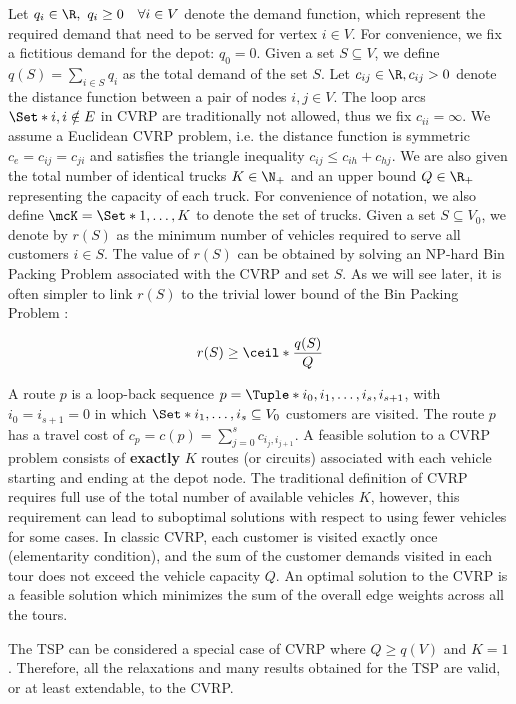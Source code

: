 Let $q_{i} \in \R,\ q_{i} \ge 0 \quad \forall i \in V$ denote the demand function, which represent the required demand that need to be served for vertex $i \in V$.
For convenience, we fix a fictitious demand for the depot: $q_0 = 0$.
Given a set $S \subseteq V$, we define $q(S) = \sum_{i \in S} q_i$ as the total demand of the set $S$.
Let $c_{ij} \in \R, c_{ij} > 0$ denote the distance function between a pair of nodes  $i, j \in V$.
The loop arcs $\Set*{i, i} \notin E$ in CVRP are traditionally not allowed, thus we fix $c_{ii} = \infty$.
We assume a Euclidean CVRP problem, i.e. the distance function is symmetric $c_e = c_{ij} = c_{ji}$ and satisfies the triangle inequality $c_{ij} \le c_{ih} + c_{hj}$.
We are also given the total number of identical trucks $K \in \N_+$ and an upper bound $Q \in \R_+$ representing the capacity of each truck.
For convenience of notation, we also define $\mcK = \Set*{1, \dots, K}$ to denote the set of trucks.
Given a set $S \subseteq V_0$, we denote by $r(S)$ as the minimum number of vehicles required to serve all customers $i \in S$.
The value of $r(S)$ can be obtained by solving an NP-hard Bin Packing Problem associated with the CVRP and set $S$.
As we will see later, it is often simpler to link $r(S)$ to the trivial lower bound of the Bin Packing Problem \parencite{martello1990}:

\begin{equation}
	r(S) \ge \ceil*{\frac{q(S)}{Q}}
\end{equation}

A route $p$ is a loop-back sequence $p = \Tuple*{i_0, i_1, \dots, i_s, i_{s + 1}}$, with $i_0 = i_{s + 1} = 0$ in which
$\Set*{i_1, \dots, i_s} \subseteq V_0$ customers are visited.
The route $p$ has a travel cost of $c_p = c(p) = \sum_{j=0}^s c_{i_j,i_{j+1}}$.
A feasible solution to a CVRP problem consists of \textbf{exactly} $K$ routes (or circuits)
associated with each vehicle starting and ending at the depot node.
The traditional definition of CVRP requires full use of the total number of available vehicles $K$,
however,
this requirement can lead to suboptimal solutions with respect to using fewer vehicles for some cases.
In classic CVRP, each customer is visited exactly once (elementarity condition),
and the sum of the customer demands visited in each tour does not exceed the vehicle capacity $Q$.
An optimal solution to the CVRP is a feasible solution which minimizes the sum of the overall edge weights across all the tours.

\medskip

The TSP can be considered a special case of CVRP where $Q \ge q(V)$ and $K = 1$.
Therefore, all the relaxations and many results obtained for the TSP are valid, or at least extendable, to the CVRP.

